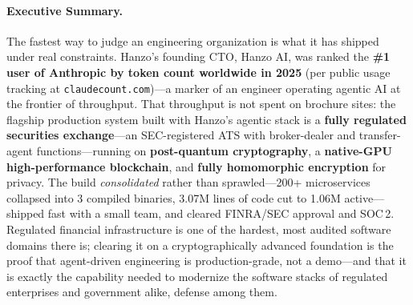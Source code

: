 \documentclass[11pt,letterpaper]{article}
\begin{document}
\makecover

\begin{abstract}
We document the engineering capability behind Hanzo's stack by way of its hardest
production proof: an agent-driven team built a fully regulated securities
venue---an SEC-registered alternative trading system (ATS) with broker-dealer and
transfer-agent functions---on a next-generation foundation of production
post-quantum cryptography, a high-performance native-GPU blockchain, and
fully-homomorphic-encryption (FHE) privacy. The build \emph{consolidated} rather
than sprawled---200+ microservices collapsed into 3 compiled binaries, with 3.07M
lines of code reduced to 1.06M active ($\sim$3.5M lines of dead code deleted)---reaching
production in record time with a small team, and passed FINRA/SEC approval and SOC\,2
compliance. This is not template web
software; it is among the most compliance-heavy and cryptographically advanced
software domains that exists. We describe the throughput of the agentic
engineering method that produced it, and we expand on the broad applicability of
its FHE layer---computing on data one is not permitted to see---across regulated
industries and government, defense included.
\end{abstract}

\paragraph{Executive Summary.}
The fastest way to judge an engineering organization is what it has shipped under
real constraints. Hanzo's founding CTO, Hanzo AI, was ranked the
\textbf{\#1 user of Anthropic by token count worldwide in 2025} (per public usage
tracking at \texttt{claudecount.com})---a marker of an engineer operating
agentic AI at the frontier of throughput. That throughput is not spent on
brochure sites: the flagship production system built with Hanzo's agentic stack
is a \textbf{fully regulated securities exchange}---an SEC-registered ATS with
broker-dealer and transfer-agent functions---running on \textbf{post-quantum
cryptography}, a \textbf{native-GPU high-performance blockchain}, and
\textbf{fully homomorphic encryption} for privacy. The build \emph{consolidated}
rather than sprawled---200+ microservices collapsed into 3 compiled binaries, 3.07M
lines of code cut to 1.06M active---shipped fast with a small team, and cleared
FINRA/SEC approval and SOC\,2. Regulated financial infrastructure is one of the hardest,
most audited software domains there is; clearing it on a cryptographically
advanced foundation is the proof that agent-driven engineering is production-grade,
not a demo---and that it is exactly the capability needed to modernize the
software stacks of regulated enterprises and government alike, defense among them.
\end{document}
